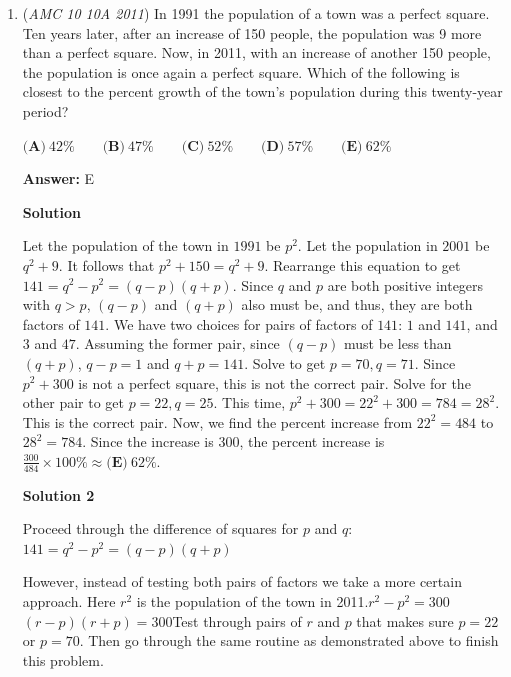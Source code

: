 \begin{enumerate}
 Subtracting this total intersecting area from the area of region $C$ (which is $\pi$), we find the area of the region of $C$ that we are looking for:
 \[\pi - (\pi - 2) = 2\]

 Thus, the final area is $\boxed{2}$, which corresponds to option (D).

 


	\item (\textit{AMC 10 10A 2011}) In 1991 the population of a town was a perfect square. Ten years later, after an increase of 150 people, the population was 9 more than a perfect square. Now, in 2011, with an increase of another 150 people, the population is once again a perfect square. Which of the following is closest to the percent growth of the town's population during this twenty-year period?


 $\textbf{(A)}\ 42\% \qquad\textbf{(B)}\ 47\% \qquad\textbf{(C)}\ 52\%\qquad\textbf{(D)}\ 57\%\qquad\textbf{(E)}\ 62\%$

 \textbf{Answer: }E



\textbf{Solution}

Let the population of the town in $1991$ be $p^2$. Let the population in $2001$ be $q^2+9$. It follows that $p^2+150=q^2+9$. Rearrange this equation to get $141=q^2-p^2=(q-p)(q+p)$. Since $q$ and $p$ are both positive integers with $q>p$, $(q-p)$ and $(q+p)$ also must be, and thus, they are both factors of $141$. We have two choices for pairs of factors of $141$: $1$ and $141$, and $3$ and $47$. Assuming the former pair, since $(q-p)$ must be less than $(q+p)$, $q-p=1$ and $q+p=141$. Solve to get $p=70, q=71$. Since $p^2+300$ is not a perfect square, this is not the correct pair. Solve for the other pair to get $p=22, q=25$. This time, $p^2+300=22^2+300=784=28^2$. This is the correct pair. Now, we find the percent increase from $22^2=484$ to $28^2=784$. Since the increase is $300$, the percent increase is $\frac{300}{484}\times100\%\approx\boxed{\textbf{(E)}\ 62\%}$.

 



\textbf{Solution 2}

Proceed through the difference of squares for $p$ and $q$:$141=q^2-p^2=(q-p)(q+p)$

 However, instead of testing both pairs of factors we take a more certain approach. Here $r^2$ is the population of the town in 2011.$r^2-p^2=300$$(r-p)(r+p)=300$Test through pairs of $r$ and $p$ that makes sure $p=22$ or $p=70$. Then go through the same routine as demonstrated above to finish this problem. 


\end{enumerate}
